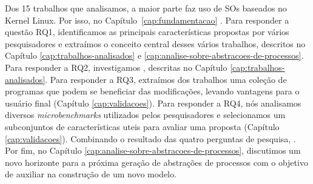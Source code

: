 Dos 15 trabalhos que analisamos, a maior parte faz uso de SOs baseados no
Kernel Linux. Por isso, no Capítulo~\ref{cap:fundamentacao} . Para
responder a questão RQ1, identificamos as principais características propostas
por vários pesquisadores e extraímos o conceito central desses vários trabalhos,
descritos no Capítulo \ref{cap:trabalhos-analisados} e
\ref{cap:analise-sobre-abstracoes-de-processos}. Para responder a RQ2,
investigamos , descritas no Capítulo
\ref{cap:trabalhos-analisados}. Para responder a RQ3, extraímos dos trabalhos uma
coleção de programas que podem se beneficiar das modificações, levando
vantagens para o usuário final (Capítulo \ref{cap:validacoes}). Para responder a
RQ4, nós analisamos diversos \emph{microbenchmarks} utilizados pelos
pesquisadores e selecionamos um subconjuntos de características uteis para
avaliar uma proposta (Capítulo \ref{cap:validacoes}). Combinando o resultado
das quatro perguntas de pesquisa, . Por fim, no
Capítulo \ref{cap:analise-sobre-abstracoes-de-processos}, discutimos um novo
horizonte para a próxima geração de abstrações de processos com o objetivo de
auxiliar na construção de um novo modelo.
